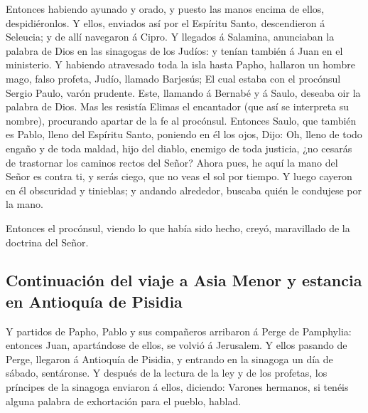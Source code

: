  Entonces habiendo ayunado y orado, y puesto las manos
encima de ellos, despidiéronlos.  Y ellos, enviados así
por el Espíritu Santo, descendieron á Seleucia; y de allí navegaron á
Cipro.  Y llegados á Salamina, anunciaban la palabra de
Dios en las sinagogas de los Judíos: y tenían también á Juan en el
ministerio.  Y habiendo atravesado toda la isla hasta
Papho, hallaron un hombre mago, falso profeta, Judío, llamado Barjesús;
 El cual estaba con el procónsul Sergio Paulo, varón
prudente. Este, llamando á Bernabé y á Saulo, deseaba oir la palabra de
Dios.  Mas les resistía Elimas el encantador (que así se
interpreta su nombre), procurando apartar de la fe al procónsul.
 Entonces Saulo, que también es Pablo, lleno del Espíritu
Santo, poniendo en él los ojos,  Dijo: Oh, lleno de todo
engaño y de toda maldad, hijo del diablo, enemigo de toda justicia, ¿no
cesarás de trastornar los caminos rectos del Señor? 
Ahora pues, he aquí la mano del Señor es contra ti, y serás ciego, que
no veas el sol por tiempo. Y luego cayeron en él obscuridad y tinieblas;
y andando alrededor, buscaba quién le condujese por la mano.

 Entonces el procónsul, viendo lo que había sido hecho,
creyó, maravillado de la doctrina del Señor.

\hypertarget{continuaciuxf3n-del-viaje-a-asia-menor-y-estancia-en-antioquuxeda-de-pisidia}{%
\subsection{Continuación del viaje a Asia Menor y estancia en Antioquía
de
Pisidia}\label{continuaciuxf3n-del-viaje-a-asia-menor-y-estancia-en-antioquuxeda-de-pisidia}}

 Y partidos de Papho, Pablo y sus compañeros arribaron á
Perge de Pamphylia: entonces Juan, apartándose de ellos, se volvió á
Jerusalem.  Y ellos pasando de Perge, llegaron á
Antioquía de Pisidia, y entrando en la sinagoga un día de sábado,
sentáronse.  Y después de la lectura de la ley y de los
profetas, los príncipes de la sinagoga enviaron á ellos, diciendo:
Varones hermanos, si tenéis alguna palabra de exhortación para el
pueblo, hablad.

